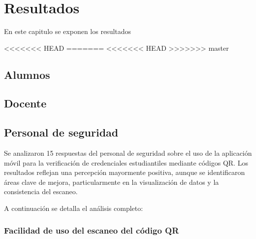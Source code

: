 \chapter{Resultados}

En este capitulo se exponen los resultados

<<<<<<< HEAD
=======
<<<<<<< HEAD
>>>>>>> master
\section{Alumnos}
\section{Docente}
\section{Personal de seguridad}

Se analizaron 15 respuestas del personal de seguridad sobre el uso de la aplicación móvil para la verificación de credenciales estudiantiles mediante códigos QR. Los resultados reflejan una percepción mayormente positiva, aunque se identificaron áreas clave de mejora, particularmente en la visualización de datos y la consistencia del escaneo.

A continuación se detalla el análisis completo:

\subsection{Facilidad de uso del escaneo del código QR}


